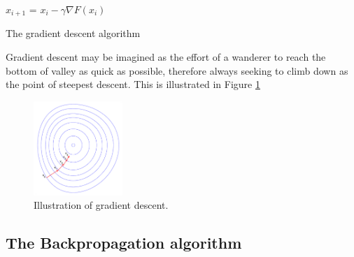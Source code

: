 \documentclass[10pt,a4paper,DIV=11]{scrreprt}
\begin{document}
\begin{algorithm}
\LinesNumbered
\DontPrintSemicolon
\BlankLine
{}
\BlankLine
\Begin
{
    {
        $x_{i+1}$ = $x_i - \gamma \nabla F(x_i)$
    }
}
\caption{The gradient descent algorithm}
\label{alg:GD}
\end{algorithm}

Gradient descent may be imagined as the effort of a wanderer to reach the bottom of valley as quick as possible, therefore always seeking to climb down as the point of steepest descent. This is illustrated in Figure \ref{fig:grad}

\begin{figure}
    \centering
    \includegraphics[width=0.3\textwidth,scale=1]{files/graddes.png}  
    \caption{Illustration of gradient descent.\cite{GRADFIG}}
    \label{fig:grad}
\end{figure}

\subsection{The Backpropagation algorithm}
\end{document}
